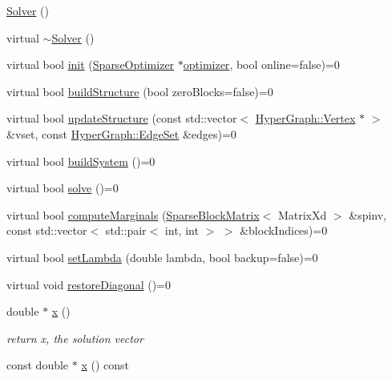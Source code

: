 \begin{DoxyCompactItemize}
\item 
\hyperlink{classg2o_1_1Solver_af097bdf5c8dc4bb017a2cec4038d5a56}{Solver} ()
\item 
virtual \hyperlink{classg2o_1_1Solver_a3b4a7c818ea0904772bc8bea6f1bbe86}{$\sim$\+Solver} ()
\item 
virtual bool \hyperlink{classg2o_1_1Solver_a532174e1ee53642880d2d59c128b037b}{init} (\hyperlink{classg2o_1_1SparseOptimizer}{Sparse\+Optimizer} $\ast$\hyperlink{classg2o_1_1Solver_a9ea585f131ab02ae1e0c0192126f0b5f}{optimizer}, bool online=false)=0
\item 
virtual bool \hyperlink{classg2o_1_1Solver_a6c93ac0f528ffe05867d33150c54f46f}{build\+Structure} (bool zero\+Blocks=false)=0
\item 
virtual bool \hyperlink{classg2o_1_1Solver_a035b8effea7178eabfb35e1c78b25987}{update\+Structure} (const std\+::vector$<$ \hyperlink{classg2o_1_1HyperGraph_1_1Vertex}{Hyper\+Graph\+::\+Vertex} $\ast$ $>$ \&vset, const \hyperlink{classg2o_1_1HyperGraph_a5e2970e236c0dcb4eff7c205d7b6b4ae}{Hyper\+Graph\+::\+Edge\+Set} \&edges)=0
\item 
virtual bool \hyperlink{classg2o_1_1Solver_ac1565e85d5ca68a87ad7f06f8164a8c0}{build\+System} ()=0
\item 
virtual bool \hyperlink{classg2o_1_1Solver_a9c359a886db57f2f81e54a2113f3bd38}{solve} ()=0
\item 
virtual bool \hyperlink{classg2o_1_1Solver_afc33768e6c024e11d9e3c9d938b59b7f}{compute\+Marginals} (\hyperlink{classg2o_1_1SparseBlockMatrix}{Sparse\+Block\+Matrix}$<$ Matrix\+Xd $>$ \&spinv, const std\+::vector$<$ std\+::pair$<$ int, int $>$ $>$ \&block\+Indices)=0
\item 
virtual bool \hyperlink{classg2o_1_1Solver_a94a0d5196c7859c6c37fc2368ac56be3}{set\+Lambda} (double lambda, bool backup=false)=0
\item 
virtual void \hyperlink{classg2o_1_1Solver_a3c40dae9b999c4d18e57b02fd0e0ade2}{restore\+Diagonal} ()=0
\item 
double $\ast$ \hyperlink{classg2o_1_1Solver_acb097d8568624a1f3af4dba808e5593b}{x} ()
\begin{DoxyCompactList}\small\item\em return x, the solution vector \end{DoxyCompactList}\item 
const double $\ast$ \hyperlink{classg2o_1_1Solver_ad46ef97021dc9f694965adc613e37296}{x} () const 
\item 

\end{DoxyCompactItemize}
